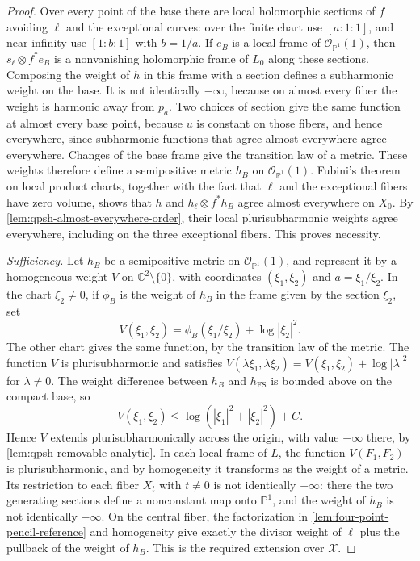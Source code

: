\begin{proof}
Over every point of the base there are local holomorphic sections of $f$ avoiding $\ell$ and the exceptional curves: over the finite chart use $[a:1:1]$, and near infinity use $[1:b:1]$ with $b=1/a$. If $e_B$ is a local frame of $\mathcal O_{\mathbb P^1}(1)$, then $s_\ell\otimes f^*e_B$ is a nonvanishing holomorphic frame of $L_0$ along these sections. Composing the weight of $h$ in this frame with a section defines a subharmonic weight on the base. It is not identically $-\infty$, because on almost every fiber the weight is harmonic away from $p_a$. Two choices of section give the same function at almost every base point, because $u$ is constant on those fibers, and hence everywhere, since subharmonic functions that agree almost everywhere agree everywhere. Changes of the base frame give the transition law of a metric. These weights therefore define a semipositive metric $h_B$ on $\mathcal O_{\mathbb P^1}(1)$. Fubini's theorem on local product charts, together with the fact that $\ell$ and the exceptional fibers have zero volume, shows that $h$ and $h_\ell\otimes f^*h_B$ agree almost everywhere on $X_0$. By \cref{lem:qpsh-almost-everywhere-order}, their local plurisubharmonic weights agree everywhere, including on the three exceptional fibers. This proves necessity.

\emph{Sufficiency.} Let $h_B$ be a semipositive metric on $\mathcal O_{\mathbb P^1}(1)$, and represent it by a homogeneous weight $V$ on $\mathbb C^2\setminus\{0\}$, with coordinates $(\xi_1,\xi_2)$ and $a=\xi_1/\xi_2$. In the chart $\xi_2\ne0$, if $\phi_B$ is the weight of $h_B$ in the frame given by the section $\xi_2$, set
\[
 V(\xi_1,\xi_2)=\phi_B(\xi_1/\xi_2)+\log|\xi_2|^2.
\]
The other chart gives the same function, by the transition law of the metric. The function $V$ is plurisubharmonic and satisfies $V(\lambda\xi_1,\lambda\xi_2)=V(\xi_1,\xi_2)+\log|\lambda|^2$ for $\lambda\ne0$. The weight difference between $h_B$ and $h_{\mathrm{FS}}$ is bounded above on the compact base, so
\[
 V(\xi_1,\xi_2)\leq\log(|\xi_1|^2+|\xi_2|^2)+C.
\]
Hence $V$ extends plurisubharmonically across the origin, with value $-\infty$ there, by \cref{lem:qpsh-removable-analytic}. In each local frame of $L$, the function $V(F_1,F_2)$ is plurisubharmonic, and by homogeneity it transforms as the weight of a metric. Its restriction to each fiber $X_t$ with $t\ne0$ is not identically $-\infty$: there the two generating sections define a nonconstant map onto $\mathbb P^1$, and the weight of $h_B$ is not identically $-\infty$. On the central fiber, the factorization in \cref{lem:four-point-pencil-reference} and homogeneity give exactly the divisor weight of $\ell$ plus the pullback of the weight of $h_B$. This is the required extension over $\mathcal X$.
\end{proof}

